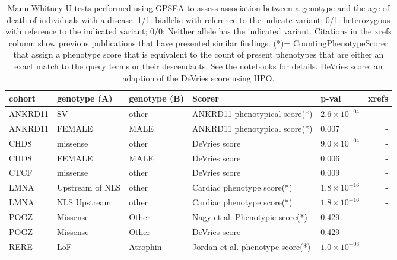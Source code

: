 \begin{table}
\centering
\begin{tabular}{lp{3.5cm}p{3.5cm}>{\raggedright}p{3cm}lr}
\toprule
\textbf{cohort} & \textbf{genotype (A)} & \textbf{genotype (B)} & \textbf{Scorer} & \textbf{p-val} & \textbf{xrefs}\\
\midrule
ANKRD11 & SV & other & ANKRD11 phenotypical score(*) & $2.6 \times 10^{-04}$ & \cite{PMID_36446582}\\
ANKRD11 & FEMALE & MALE & ANKRD11 phenotypical score(*) & 0.007 & -\\
CHD8 & missense & other & DeVries score & $9.0 \times 10^{-04}$ & -\\
CHD8 & FEMALE & MALE & DeVries score & 0.006 & -\\
CTCF & missense & other & DeVries score & 0.009 & -\\
LMNA & Upstream of NLS & other & Cardiac phenotype score(*) & $1.8 \times 10^{-16}$ & -\\
LMNA & NLS Upstream & other & Cardiac phenotype score(*)& $1.8 \times 10^{-16}$ & -\\
POGZ & Missense & Other &  Nagy et al. Phenotypic  score(*)  & 0.429 & \cite{PMID_35052493}\\
POGZ & Missense & Other &  DeVries score & 0.429 & -\\
RERE & LoF & Atrophin & Jordan et al.  phenotype score(*)  & $1.0 \times 10^{-03}$ & \cite{PMID_29330883}\\
\bottomrule
\end{tabular}
\caption{Mann-Whitney U tests performed using GPSEA to assess association between a genotype and the age of
    death of individuals with a disease. 1/1: biallelic with reference to the indicate variant; 
    0/1: heterozygous with reference to the indicated variant; 0/0: Neither allele has the indicated variant.
    Citations in the xrefs column show previous publications that have presented similar findings. (*)= CountingPhenotypeScorer that assign a phenotype score that is equivalent to the count of present phenotypes that are either an exact match to the query terms or their descendants. See the notebooks for details. DeVries score: an adaption of the DeVries score \cite{PMID_34521999} using HPO.}
\label{tab:to_do}
\end{table}

\clearpage
\newpage
